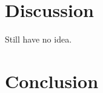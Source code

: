 \documentclass[fleqn,usenatbib]{mnras}
\begin{document}
\section{Discussion}
Still have no idea. 
\section{Conclusion}







\end{document}
